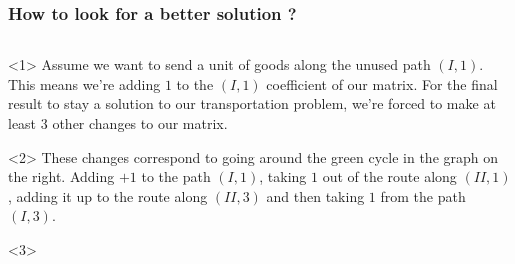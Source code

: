\documentclass[32pt,aspectratio=169]{beamer}
\begin{document}
\begin{frame}
  \frametitle{How to look for a better solution ?}
  \begin{columns}
   \begin{column}{.6\textwidth}
     \begin{overlayarea}{\textwidth}{.35\textheight}
       \begin{onlyenv}<1> 
         Assume we want to send a unit of goods along the unused path
         $(I, 1)$. This means we're adding $1$ to the $(I, 1)$
         coefficient of our matrix. For the final result to stay a
         solution to our transportation problem, we're forced to make
         at least $3$ other changes to our matrix.
     \end{onlyenv}
     \begin{onlyenv}<2> 
       These changes correspond to going around the green cycle in the
       graph on the right. Adding $+1$ to the path $(I, 1)$, taking
       $1$ out of the route along $(II, 1)$, adding it up to the route
       along $(II, 3)$ and then taking $1$ from the path $(I, 3)$.
     \end{onlyenv}
     \begin{onlyenv}<3> 
       

\end{onlyenv}
\end{overlayarea}
\end{column}
\end{columns}
\end{frame}
\end{document}
